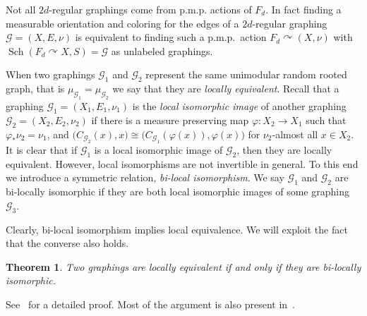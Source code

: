 \documentclass[11pt]{article}
\newtheorem{theo}{Theorem}[section]
\theoremstyle{definition}
\numberwithin{equation}{section}
\numberwithin{figure}{section}
\numberwithin{table}{section}
\newcommand{\G}{\mathcal{G}}
\DeclareMathOperator{\Sch}{Sch}
\newcommand{\acts}{\curvearrowright}
\begin{document}
Not all $2d$-regular graphings come from p.m.p. actions of $F_d$. In fact finding a measurable orientation and coloring for the edges of a $2d$-regular graphing $\G=(X,E, \nu)$ is equivalent to finding such a p.m.p.\ action $F_d \acts (X, \nu)$ with $\Sch(F_d \acts X, S)=\G$ as unlabeled graphings.

When two graphings $\G_1$ and $\G_2$ represent the same unimodular random rooted graph, that is $\mu_{\G_1} = \mu_{\G_2}$ we say that they are \emph{locally equivalent}. Recall that a graphing $\G_1=(X_1, E_1, \nu_1)$ is the \emph{local isomorphic image} of another graphing $\G_2=(X_2, E_2, \nu_2)$ if there is a measure preserving map $\varphi: X_2 \to X_1$ such that $\varphi_{*}\nu_2=\nu_1$, and $\big(C_{\G_2}(x),x\big) \cong \big(C_{\G_1}(\varphi(x)),\varphi(x)\big)$ for $\nu_2$-almost all $x \in X_2$. It is clear that if $\G_1$ is a local isomorphic image of $\G_2$, then they are locally equivalent. However, local isomorphisms are not invertible in general. To this end we introduce a symmetric relation, \emph{bi-local isomorphism}. We say $\G_1$ and $\G_2$ are bi-locally isomorphic if they are both local isomorphic images of some graphing $\G_3$.

Clearly, bi-local isomorphism implies local equivalence. We will exploit the fact that the converse also holds.

\begin{theo}\label{theorem:bilocal}
Two graphings are locally equivalent if and only if they are bi-locally isomorphic.
\end{theo}

See~\cite[Theorem~18.59]{lovasz2012large} for a detailed proof. Most of the argument is also present in~\cite{hatami2014limits}.

\end{document}
